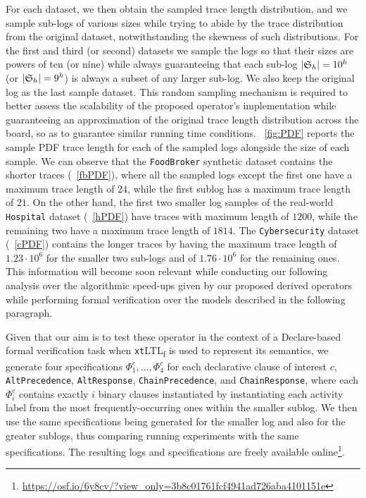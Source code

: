 \documentclass[sigconf]{acmart}
\begin{document}
For each dataset, we then obtain the sampled trace length distribution, and we sample sub-logs of various sizes while trying to abide by the trace distribution from the original dataset, notwithstanding the skewness of such distributions. For the first and third (or second) datasets we sample the logs so that their sizes are powers of ten (or nine) while always guaranteeing that each sub-log $|\mathfrak{S}_h|=10^h$ (or $|\mathfrak{S}_h|=9^h$) is always a subset of any larger sub-log. We also keep the original log as the last sample dataset. This random sampling mechanism is required to better assess the scalability of the proposed operator's implementation while guaranteeing an approximation of the original trace length distribution across the board, so as to guarantee similar running time conditions. \figurename~\ref{fig:PDF} reports the sample PDF trace length for each of the sampled logs alongside the size of each sample. We can observe that the \texttt{FoodBroker} synthetic dataset contains the shorter traces (\figurename~\ref{fbPDF}), where all the sampled logs except the first one have a maximum trace length of $24$, while the first sublog has a maximum trace length of $21$. On the other hand, the first two smaller log samples of the real-world \texttt{Hospital} dataset (\figurename~\ref{hPDF}) have traces with maximum length of $1200$, while the remaining two have a maximum trace length of $1814$. The \texttt{Cybersecurity} dataset (\figurename ~\ref{cPDF}) contains the longer traces by having the maximum trace length of $1.23\cdot10^6$ for the smaller two sub-logs and of $1.76\cdot 10^6$ for the remaining ones. This information will become soon relevant while conducting our following analysis over the algorithmic speed-ups given by our proposed derived operators while performing formal verification over the models described in the following paragraph.


 Given that our aim is to test these operator in the context of a Declare-based formal verification task when \texttt{xt}LTL\textsubscript{f} is used to represent its semantics, we generate four specifications $\Phi^c_1,\dots,\Phi^c_4$ for each declarative clause of interest $c$, \texttt{AltPrecedence}, \texttt{AltResponse}, \texttt{ChainPrecedence}, and \texttt{ChainResponse}, where each $\Phi^c_i$ contains exactly $i$ binary clauses instantiated by instantiating each activity label from the most frequently-occurring ones within the smaller sublog. We then use the same specifications being generated for the smaller log and also for the greater sublogs, thus comparing running experiments with the same specifications. The resulting logs and specifications are freely available online\footnote{\url{https://osf.io/6y8cv/?view_only=3b8c01761fcf4941ad726aba4101151e}}. \medskip
\end{document}
